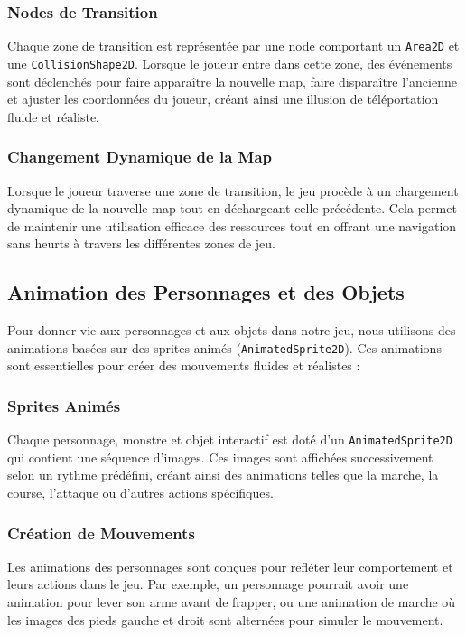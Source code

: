 \subsubsection{Nodes de Transition}

Chaque zone de transition est représentée par une node comportant un \texttt{Area2D} et une \texttt{CollisionShape2D}.
Lorsque le joueur entre dans cette zone, des événements sont déclenchés pour faire apparaître la nouvelle map, faire disparaître l'ancienne et ajuster les coordonnées du joueur, créant ainsi une illusion de téléportation fluide et réaliste.

\subsubsection{Changement Dynamique de la Map}

Lorsque le joueur traverse une zone de transition, le jeu procède à un chargement dynamique de la nouvelle map tout en déchargeant celle précédente. 
Cela permet de maintenir une utilisation efficace des ressources tout en offrant une navigation sans heurts à travers les différentes zones de jeu.

\subsection{Animation des Personnages et des Objets}

Pour donner vie aux personnages et aux objets dans notre jeu, nous utilisons des animations basées sur des sprites animés (\texttt{AnimatedSprite2D}). 
Ces animations sont essentielles pour créer des mouvements fluides et réalistes :

\subsubsection{Sprites Animés}

Chaque personnage, monstre et objet interactif est doté d'un \texttt{AnimatedSprite2D} qui contient une séquence d'images.
Ces images sont affichées successivement selon un rythme prédéfini, créant ainsi des animations telles que la marche, la course, l'attaque ou d'autres actions spécifiques.

\subsubsection{Création de Mouvements}

Les animations des personnages sont conçues pour refléter leur comportement et leurs actions dans le jeu. 
Par exemple, un personnage pourrait avoir une animation pour lever son arme avant de frapper, ou une animation de marche où les images des pieds gauche et droit sont alternées pour simuler le mouvement.
\\

